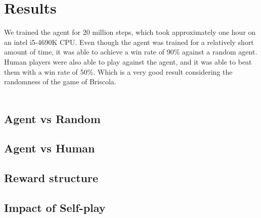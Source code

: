 \section{Results}
We trained the agent for 20 million steps, which took approximately one hour on an intel i5-4690K CPU. Even though the agent was trained for a relatively short amount of time, it was able to achieve a win rate of 90\% against a random agent. Human players were also able to play against the agent, and it was able to beat them with a win rate of 50\%. Which is a very good result considering the randomness of the game of Briscola.\\\\

\subsection{Agent vs Random}

\subsection{Agent vs Human}

\subsection{Reward structure}

\subsection{Impact of Self-play}